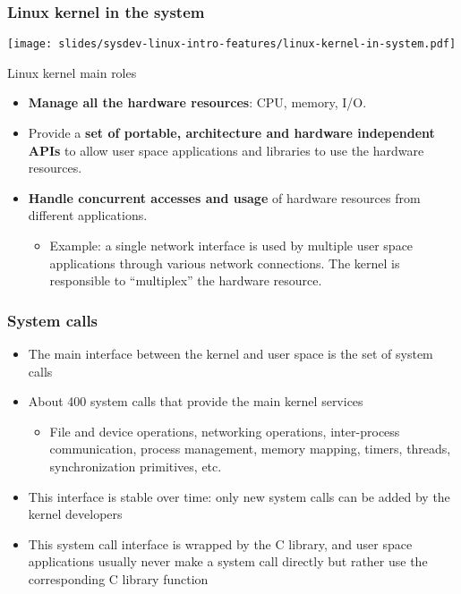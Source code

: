 \begin{frame}
  \frametitle{Linux kernel in the system}
  \begin{center}
    \texttt{[image: slides/sysdev-linux-intro-features/linux-kernel-in-system.pdf]}
  \end{center}
\end{frame}

\begin{frame}{Linux kernel main roles}
  \begin{itemize}
  \item {\bf Manage all the hardware resources}: CPU, memory, I/O.
  \item Provide a {\bf set of portable, architecture and hardware
      independent APIs} to allow user space applications and libraries
    to use the hardware resources.
  \item {\bf Handle concurrent accesses and usage} of hardware
    resources from different applications.
    \begin{itemize}
    \item Example: a single network interface is used by multiple
      user space applications through various network connections. The
      kernel is responsible to ``multiplex'' the hardware resource.
    \end{itemize}
  \end{itemize}
\end{frame}

\begin{frame}
  \frametitle{System calls}
  \begin{itemize}
  \item The main interface between the kernel and user space is the set
    of system calls
  \item About 400 system calls that provide the main kernel services
    \begin{itemize}
    \item File and device operations, networking operations,
      inter-process communication, process management, memory mapping,
      timers, threads, synchronization primitives, etc.
    \end{itemize}
  \item This interface is stable over time: only new system calls can
    be added by the kernel developers
  \item This system call interface is wrapped by the C library, and
    user space applications usually never make a system call directly
    but rather use the corresponding C library function
  \end{itemize}
\end{frame}


